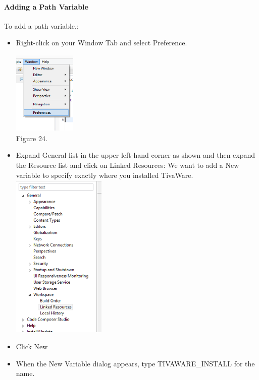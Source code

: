 \documentclass[a4paper,10pt,oneside]{article}
\begin{document}
				\paragraph{\textbf{Adding a Path Variable}\\}
					To add a path variable,:
					\begin{itemize}
						\item Right-click on your Window Tab and select Preference.\\
							\begin{center}
							\includegraphics[width=3cm, height=4cm]{Images/AddVariables}\\
							Figure 24.
							\end{center}
						\item Expand General list  in the upper left-hand corner as shown and then expand the Resource list and click on Linked Resources:
						We want to add a New variable to specify exactly where you installed TivaWare.\\
						\includegraphics[height=8cm]{Images/AddVariables2}
						\item Click New
						\item When the New Variable
						dialog appears,
						type TIVAWARE\_INSTALL
						for the name.\\
						\begin{center}

\end{center}
\end{itemize}
\end{document}

